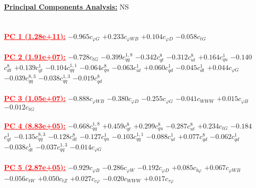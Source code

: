 \documentclass{article}
\begin{document}
\noindent \underline{\bf{Principal Components Analysis}:} NS\\ \\ \\
\noindent \textcolor{red}{\underline{\bf{PC 1} (1.28e+11):}}
{$-0.965$}{\rm $c_{\varphi G}$} 
{$+0.233$}{\rm $c_{\varphi WB}$} 
{$+0.104$}{\rm $c_{\varphi D}$} 
{$-0.058$}{\rm $c_{tG}$} 
 \nonumber \\ \nonumber \\ 
\noindent \textcolor{red}{\underline{\bf{PC 2} (1.91e+07):}}
{$-0.728$}{\rm $c_{tG}$} 
{$-0.399$}{\rm $c_{qq}^{1,8}$} 
{$-0.342$}{\rm $c_{qt}^{8}$} 
{$-0.312$}{\rm $c_{ut}^{8}$} 
{$+0.164$}{\rm $c_{qu}^{1}$} 
{$-0.140$}{\rm $c_{dt}^{8}$} 
{$+0.139$}{\rm $c_{qt}^{1}$} 
{$-0.104$}{\rm $c_{qq}^{1,1}$} 
{$-0.064$}{\rm $c_{qu}^{8}$} 
{$-0.063$}{\rm $c_{ut}^{1}$} 
{$+0.060$}{\rm $c_{qd}^{1}$} 
{$-0.045$}{\rm $c_{dt}^{1}$} 
{$+0.044$}{\rm $c_{\varphi G}$} 
{$-0.039$}{\rm $c_{qq}^{8,3}$} 
{$-0.038$}{\rm $c_{qq}^{1,3}$} 
{$-0.019$}{\rm $c_{qd}^{8}$} 
 \nonumber \\ \nonumber \\ 
\noindent \textcolor{red}{\underline{\bf{PC 3} (1.05e+07):}}
{$-0.888$}{\rm $c_{\varphi WB}$} 
{$-0.380$}{\rm $c_{\varphi D}$} 
{$-0.255$}{\rm $c_{\varphi G}$} 
{$-0.041$}{\rm $c_{WWW}$} 
{$+0.015$}{\rm $c_{\varphi B}$} 
{$-0.012$}{\rm $c_{tG}$} 
 \nonumber \\ \nonumber \\ 
\noindent \textcolor{red}{\underline{\bf{PC 4} (8.83e+05):}}
{$-0.668$}{\rm $c_{qq}^{1,8}$} 
{$+0.459$}{\rm $c_{qt}^{8}$} 
{$+0.299$}{\rm $c_{qu}^{8}$} 
{$-0.287$}{\rm $c_{ut}^{8}$} 
{$+0.234$}{\rm $c_{tG}$} 
{$-0.184$}{\rm $c_{qt}^{1}$} 
{$-0.135$}{\rm $c_{qq}^{8,3}$} 
{$-0.128$}{\rm $c_{dt}^{8}$} 
{$-0.127$}{\rm $c_{qu}^{1}$} 
{$-0.103$}{\rm $c_{qq}^{1,1}$} 
{$-0.088$}{\rm $c_{ut}^{1}$} 
{$+0.077$}{\rm $c_{qd}^{8}$} 
{$-0.062$}{\rm $c_{qd}^{1}$} 
{$-0.038$}{\rm $c_{dt}^{1}$} 
{$-0.037$}{\rm $c_{qq}^{1,3}$} 
{$-0.014$}{\rm $c_{\varphi G}$} 
 \nonumber \\ \nonumber \\ 
\noindent \textcolor{red}{\underline{\bf{PC 5} (2.87e+05):}}
{$-0.929$}{\rm $c_{\varphi B}$} 
{$-0.286$}{\rm $c_{\varphi W}$} 
{$-0.192$}{\rm $c_{\varphi D}$} 
{$+0.085$}{\rm $c_{b \varphi}$} 
{$+0.067$}{\rm $c_{\varphi WB}$} 
{$-0.056$}{\rm $c_{tW}$} 
{$+0.050$}{\rm $c_{tZ}$} 
{$+0.027$}{\rm $c_{c \varphi}$} 
{$-0.020$}{\rm $c_{WWW}$} 
{$+0.017$}{\rm $c_{\tau \varphi}$} 
 \nonumber \\ \nonumber \\ 
\end{document}
